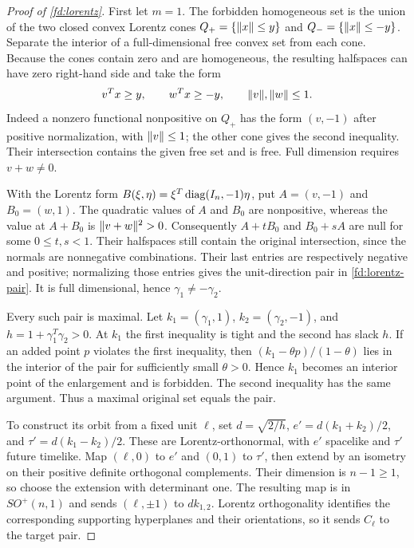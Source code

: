 \begin{proof}[Proof of \cref{fd:lorentz}]
\label{fd:lorentz-proof}
First let $m=1$. The forbidden homogeneous set is the union of
the two closed convex Lorentz cones
$Q_+=\{\lVert x\rVert\le y\}$ and $Q_-=\{\lVert x\rVert\le-y\}$.
Separate the interior of a full-dimensional free convex set from
each cone. Because the cones contain zero and are homogeneous,
the resulting halfspaces can have zero right-hand side and take
the form
\[
 v^Tx\ge y,\qquad w^Tx\ge-y,\qquad \lVert v\rVert,\lVert w\rVert\le1.
\]
Indeed a nonzero functional nonpositive on $Q_+$ has the form
$(v,-1)$ after positive normalization, with $\lVert v\rVert\le1$;
the other cone gives the second inequality.
Their intersection contains the given free set and is free.
Full dimension requires $v+w\ne0$.

With the Lorentz form $B(\xi,\eta)=\xi^T
\operatorname{diag}(I_n,-1)\eta$, put $A=(v,-1)$ and $B_0=(w,1)$.
The quadratic values of $A$ and $B_0$ are nonpositive, whereas
the value at $A+B_0$ is $\lVert v+w\rVert^2>0$.
Consequently $A+tB_0$ and $B_0+sA$ are null for some
$0\le t,s<1$. Their halfspaces still contain the original
intersection, since the normals are nonnegative combinations.
Their last entries are respectively negative and positive;
normalizing those entries gives the unit-direction pair in
\cref{fd:lorentz-pair}. It is full dimensional, hence
$\gamma_1\ne-\gamma_2$.

Every such pair is maximal. Let
$k_1=(\gamma_1,1)$, $k_2=(\gamma_2,-1)$, and
$h=1+\gamma_1^T\gamma_2>0$. At $k_1$ the first inequality is tight
and the second has slack $h$. If an added point $p$ violates the
first inequality, then
$(k_1-\theta p)/(1-\theta)$ lies in the interior of the pair for
sufficiently small $\theta>0$. Hence $k_1$ becomes an interior
point of the enlargement and is forbidden. The second inequality
has the same argument. Thus a maximal original set equals the pair.

To construct its orbit from a fixed unit $\ell$, set
$d=\sqrt{2/h}$,
$e'=d(k_1+k_2)/2$, and $\tau'=d(k_1-k_2)/2$.
These are Lorentz-orthonormal, with $e'$ spacelike and $\tau'$
future timelike. Map $(\ell,0)$ to $e'$ and $(0,1)$ to $\tau'$,
then extend by an isometry on their positive definite orthogonal
complements. Their dimension is $n-1\ge1$, so choose the extension
with determinant one. The resulting map is in $SO^+(n,1)$ and
sends $(\ell,\pm1)$ to $dk_{1,2}$. Lorentz orthogonality identifies
the corresponding supporting hyperplanes and their orientations,
so it sends $C_\ell$ to the target pair.


\end{proof}
